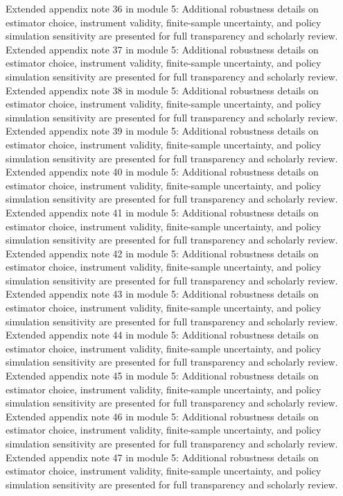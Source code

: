 \documentclass[preprint,12pt]{elsarticle}
\begin{document}
Extended appendix note 36 in module 5: Additional robustness details on estimator choice, instrument validity, finite-sample uncertainty, and policy simulation sensitivity are presented for full transparency and scholarly review.
Extended appendix note 37 in module 5: Additional robustness details on estimator choice, instrument validity, finite-sample uncertainty, and policy simulation sensitivity are presented for full transparency and scholarly review.
Extended appendix note 38 in module 5: Additional robustness details on estimator choice, instrument validity, finite-sample uncertainty, and policy simulation sensitivity are presented for full transparency and scholarly review.
Extended appendix note 39 in module 5: Additional robustness details on estimator choice, instrument validity, finite-sample uncertainty, and policy simulation sensitivity are presented for full transparency and scholarly review.
Extended appendix note 40 in module 5: Additional robustness details on estimator choice, instrument validity, finite-sample uncertainty, and policy simulation sensitivity are presented for full transparency and scholarly review.
Extended appendix note 41 in module 5: Additional robustness details on estimator choice, instrument validity, finite-sample uncertainty, and policy simulation sensitivity are presented for full transparency and scholarly review.
Extended appendix note 42 in module 5: Additional robustness details on estimator choice, instrument validity, finite-sample uncertainty, and policy simulation sensitivity are presented for full transparency and scholarly review.
Extended appendix note 43 in module 5: Additional robustness details on estimator choice, instrument validity, finite-sample uncertainty, and policy simulation sensitivity are presented for full transparency and scholarly review.
Extended appendix note 44 in module 5: Additional robustness details on estimator choice, instrument validity, finite-sample uncertainty, and policy simulation sensitivity are presented for full transparency and scholarly review.
Extended appendix note 45 in module 5: Additional robustness details on estimator choice, instrument validity, finite-sample uncertainty, and policy simulation sensitivity are presented for full transparency and scholarly review.
Extended appendix note 46 in module 5: Additional robustness details on estimator choice, instrument validity, finite-sample uncertainty, and policy simulation sensitivity are presented for full transparency and scholarly review.
Extended appendix note 47 in module 5: Additional robustness details on estimator choice, instrument validity, finite-sample uncertainty, and policy simulation sensitivity are presented for full transparency and scholarly review.
\end{document}
